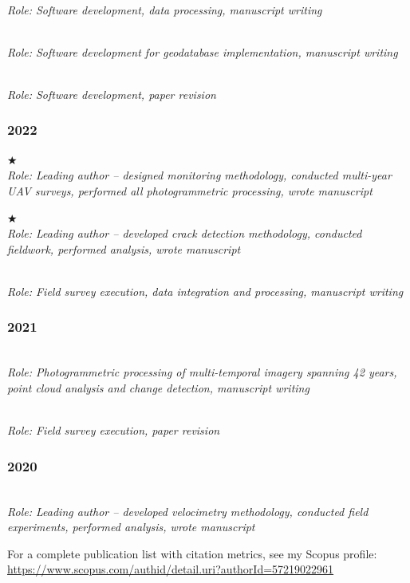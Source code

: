 \documentclass[11pt,a4paper]{article}
\newcommand{\starred}{\ensuremath{\bigstar}~}
\begin{document}
\vspace{8pt}
\noindent{} \\
\textit{Role: Software development, data processing, manuscript writing}

\vspace{8pt}
\noindent{} \\
\textit{Role: Software development for geodatabase implementation, manuscript writing}

\vspace{8pt}
\noindent{} \\
\textit{Role: Software development, paper revision}

\subsubsection*{2022}

\noindent\starred{} \\
\textit{Role: Leading author -- designed monitoring methodology, conducted multi-year UAV surveys, performed all photogrammetric processing, wrote manuscript}

\vspace{8pt}
\noindent\starred{} \\
\textit{Role: Leading author -- developed crack detection methodology, conducted fieldwork, performed analysis, wrote manuscript}

\vspace{8pt}
\noindent{} \\
\textit{Role: Field survey execution, data integration and processing, manuscript writing}

\subsubsection*{2021}

\noindent{} \\
\textit{Role: Photogrammetric processing of multi-temporal imagery spanning 42 years, point cloud analysis and change detection, manuscript writing}

\vspace{8pt}
\noindent{} \\
\textit{Role: Field survey execution, paper revision}

\subsubsection*{2020}

\noindent{} \\
\textit{Role: Leading author -- developed velocimetry methodology, conducted field experiments, performed analysis, wrote manuscript}

\vspace{8pt}
\noindent For a complete publication list with citation metrics, see my Scopus profile: \url{https://www.scopus.com/authid/detail.uri?authorId=57219022961}
\end{document}
